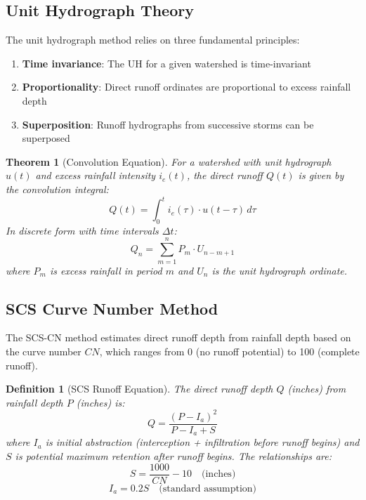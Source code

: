\documentclass[a4paper, 11pt]{article}
\newtheorem{definition}{Definition}[section]
\newtheorem{theorem}{Theorem}[section]
\begin{document}
\subsection{Unit Hydrograph Theory}

The unit hydrograph method relies on three fundamental principles:

\begin{enumerate}
\item \textbf{Time invariance}: The UH for a given watershed is time-invariant
\item \textbf{Proportionality}: Direct runoff ordinates are proportional to excess rainfall depth
\item \textbf{Superposition}: Runoff hydrographs from successive storms can be superposed
\end{enumerate}

\begin{theorem}[Convolution Equation]
For a watershed with unit hydrograph $u(t)$ and excess rainfall intensity $i_e(t)$,
the direct runoff $Q(t)$ is given by the convolution integral:
\begin{equation}
Q(t) = \int_0^t i_e(\tau) \cdot u(t - \tau) \, d\tau
\end{equation}
In discrete form with time intervals $\Delta t$:
\begin{equation}
Q_n = \sum_{m=1}^{n} P_m \cdot U_{n-m+1}
\end{equation}
where $P_m$ is excess rainfall in period $m$ and $U_n$ is the unit hydrograph ordinate.
\end{theorem}

\subsection{SCS Curve Number Method}

The SCS-CN method estimates direct runoff depth from rainfall depth based on the curve number $CN$,
which ranges from 0 (no runoff potential) to 100 (complete runoff).

\begin{definition}[SCS Runoff Equation]
The direct runoff depth $Q$ (inches) from rainfall depth $P$ (inches) is:
\begin{equation}
Q = \frac{(P - I_a)^2}{P - I_a + S}
\end{equation}
where $I_a$ is initial abstraction (interception + infiltration before runoff begins)
and $S$ is potential maximum retention after runoff begins. The relationships are:
\begin{equation}
S = \frac{1000}{CN} - 10 \quad \text{(inches)}
\end{equation}
\begin{equation}
I_a = 0.2S \quad \text{(standard assumption)}
\end{equation}
\end{definition}
\end{document}

